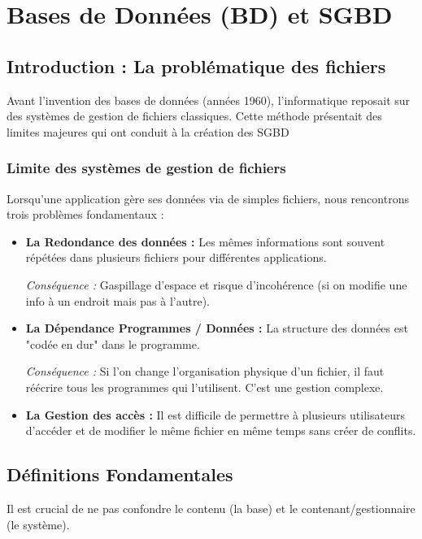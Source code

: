 \chapter{Bases de Données (BD) et SGBD}

\section{Introduction : La problématique des fichiers}

Avant l'invention des bases de données (années 1960), l'informatique reposait sur des systèmes de gestion de fichiers classiques. Cette méthode présentait des limites majeures qui ont conduit à la création des SGBD

\subsection{Limite des systèmes de gestion de fichiers}

Lorsqu'une application gère ses données via de simples fichiers, nous rencontrons trois problèmes fondamentaux :

\begin{itemize}
\item \textbf{La Redondance des données :} Les mêmes informations sont souvent répétées dans plusieurs fichiers pour différentes applications.

\textit{Conséquence :} Gaspillage d'espace et risque d'incohérence (si on modifie une info à un endroit mais pas à l'autre).
\item \textbf{La Dépendance Programmes / Données :} La structure des données est "codée en dur" dans le programme.

\textit{Conséquence :} Si l'on change l'organisation physique d'un fichier, il faut réécrire tous les programmes qui l'utilisent. C'est une gestion complexe.
\item \textbf{La Gestion des accès :} Il est difficile de permettre à plusieurs utilisateurs d'accéder et de modifier le même fichier en même temps sans créer de conflits.
\end{itemize}

\section{Définitions Fondamentales}

Il est crucial de ne pas confondre le contenu (la base) et le contenant/gestionnaire (le système).


